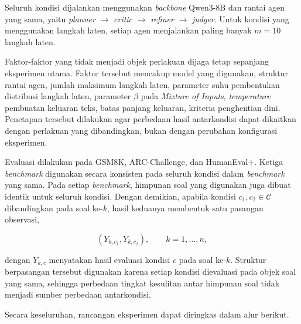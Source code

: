 Seluruh kondisi dijalankan menggunakan \textit{backbone} Qwen3-8B dan
rantai agen yang sama, yaitu
\textit{planner} $\rightarrow$ \textit{critic} $\rightarrow$
\textit{refiner} $\rightarrow$ \textit{judger}. Untuk kondisi yang
menggunakan langkah laten, setiap agen menjalankan paling banyak
$m=10$ langkah laten.

Faktor-faktor yang tidak menjadi objek perlakuan dijaga tetap sepanjang
eksperimen utama. Faktor tersebut mencakup model yang digunakan, struktur
rantai agen, jumlah maksimum langkah laten, parameter suhu pembentukan
distribusi langkah laten, parameter $\beta$ pada \textit{Mixture of
Inputs}, \textit{temperature} pembuatan keluaran teks, batas panjang
keluaran, kriteria penghentian dini. Penetapan tersebut dilakukan agar
perbedaan hasil antarkondisi dapat dikaitkan dengan perlakuan yang
dibandingkan, bukan dengan perubahan konfigurasi eksperimen.

Evaluasi dilakukan pada GSM8K, ARC-Challenge, dan HumanEval+. Ketiga
\textit{benchmark} digunakan secara konsisten pada seluruh kondisi dalam
\textit{benchmark} yang sama. Pada setiap \textit{benchmark}, himpunan
soal yang digunakan juga dibuat identik untuk seluruh kondisi. Dengan
demikian, apabila kondisi $c_1,c_2\in\mathcal{C}$ dibandingkan pada soal
ke-$k$, hasil keduanya membentuk satu pasangan observasi,

\begin{equation}
\left(
Y_{k,c_1},
Y_{k,c_2}
\right),
\qquad
k=1,\ldots,n,
\label{eq:pasangan-observasi}
\end{equation}

dengan $Y_{k,c}$ menyatakan hasil evaluasi kondisi $c$ pada soal ke-$k$.
Struktur berpasangan tersebut digunakan karena setiap kondisi dievaluasi
pada objek soal yang sama, sehingga perbedaan tingkat kesulitan antar
himpunan soal tidak menjadi sumber perbedaan antarkondisi.

Secara keseluruhan, rancangan eksperimen dapat diringkas dalam alur
berikut.

